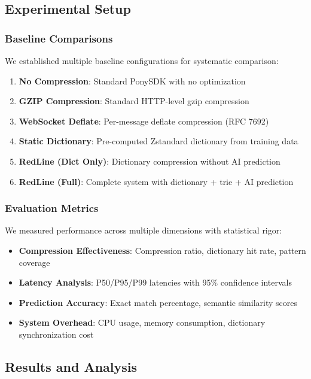 \documentclass[12pt,a4paper]{article}
\begin{document}
\subsection{Experimental Setup}

\subsubsection{Baseline Comparisons}

We established multiple baseline configurations for systematic comparison:

\begin{enumerate}
    \item \textbf{No Compression}: Standard PonySDK with no optimization
    \item \textbf{GZIP Compression}: Standard HTTP-level gzip compression
    \item \textbf{WebSocket Deflate}: Per-message deflate compression (RFC 7692)
    \item \textbf{Static Dictionary}: Pre-computed Zstandard dictionary from training data
    \item \textbf{RedLine (Dict Only)}: Dictionary compression without AI prediction
    \item \textbf{RedLine (Full)}: Complete system with dictionary + trie + AI prediction
\end{enumerate}

\subsubsection{Evaluation Metrics}

We measured performance across multiple dimensions with statistical rigor:

\begin{itemize}
    \item \textbf{Compression Effectiveness}: Compression ratio, dictionary hit rate, pattern coverage
    \item \textbf{Latency Analysis}: P50/P95/P99 latencies with 95\% confidence intervals
    \item \textbf{Prediction Accuracy}: Exact match percentage, semantic similarity scores
    \item \textbf{System Overhead}: CPU usage, memory consumption, dictionary synchronization cost
\end{itemize}

\subsection{Results and Analysis}
\end{document}
